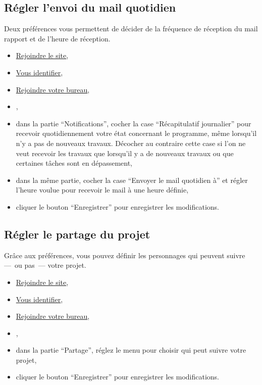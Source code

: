 \subsection{Régler l'envoi du mail quotidien}\hypertarget{regler-mail-quotidien}{}\label{regler-mail-quotidien}

Deux préférences vous permettent de décider de la fréquence de réception du mail rapport et de l'heure de réception.

\begin{itemize}
\item \hyperlink{rejoindre-site}{Rejoindre le site},
\item \hyperlink{vous-identifier}{Vous identifier},
\item \hyperlink{rejoindre-bureau}{Rejoindre votre bureau},
\item {},
\item dans la partie \enquote{Notifications}, cocher la case \enquote{Récapitulatif journalier} pour recevoir quotidiennement votre état concernant le programme, même lorsqu'il n'y a pas de nouveaux travaux. Décocher au contraire cette case si l'on ne veut recevoir les travaux que lorsqu'il y a de nouveaux travaux ou que certaines tâches sont en dépassement,
\item dans la même partie, cocher la case \enquote{Envoyer le mail quotidien à} et régler l'heure voulue pour recevoir le mail à une heure définie,
\item cliquer le bouton \enquote{Enregistrer} pour enregistrer les modifications.
\end{itemize}

\subsection{Régler le partage du projet}\hypertarget{regler-partage-projet}{}\label{regler-partage-projet}

Grâce aux préférences, vous pouvez définir les personnages qui peuvent suivre —~{}ou pas~{}— votre projet.

\begin{itemize}
\item \hyperlink{rejoindre-site}{Rejoindre le site},
\item \hyperlink{vous-identifier}{Vous identifier},
\item \hyperlink{rejoindre-bureau}{Rejoindre votre bureau},
\item {},
\item dans la partie \enquote{Partage}, réglez le menu pour choisir qui peut suivre votre projet,
\item cliquer le bouton \enquote{Enregistrer} pour enregistrer les modifications.
\end{itemize}
